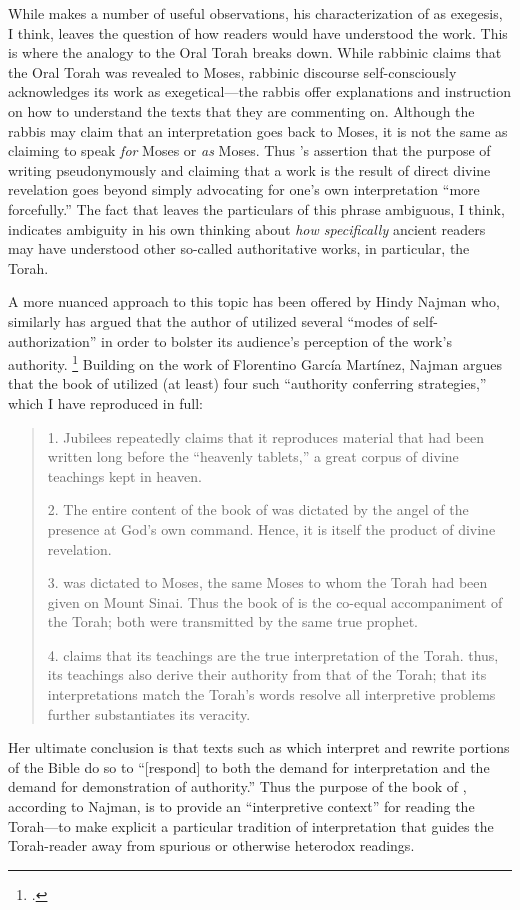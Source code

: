 While \vanderkam makes a number of useful observations, his characterization of \jub as exegesis, I think, leaves the question of how readers would have understood the work. This is where the analogy to the Oral Torah breaks down. While rabbinic claims that the Oral Torah was revealed to Moses, rabbinic discourse self-consciously acknowledges its work as exegetical---the rabbis offer explanations and instruction on how to understand the texts that they are commenting on. Although the rabbis may claim that an interpretation goes back to Moses, it is not the same as claiming to speak \emph{for} Moses or \emph{as} Moses. Thus \vanderkam's assertion that the purpose of writing pseudonymously and claiming that a work is the result of direct divine revelation goes beyond simply advocating for one's own interpretation ``more forcefully.'' The fact that \vanderkam leaves the particulars of this phrase ambiguous, I think, indicates ambiguity in his own thinking about \emph{how specifically} ancient readers may have understood \jub \visavis other so-called authoritative works, in particular, the Torah.

A more nuanced approach to this topic has been offered by Hindy Najman who, similarly has argued that the author of \jub utilized several ``modes of self-authorization'' in order to bolster its audience's perception of the work's authority.%
    \footnote{\cite[380]{najman_jsj1999}.}
Building on the work of Florentino García Martínez,\autocite{martinez_najman-tigchelaar2012} Najman argues that the book of \jub utilized (at least) four such ``authority conferring strategies,'' which I have reproduced in full:
    \begin{quote}
        1. Jubilees repeatedly claims that it reproduces material that had been written long before the ``heavenly tablets,'' a great corpus of divine teachings kept in heaven.

        2. The entire content of the book of \jub was dictated by the angel of the presence at God's own command. Hence, it is itself the product of divine revelation.

        3. \jub was dictated to Moses, the same Moses to whom the Torah had been given on Mount Sinai. Thus the book of \jub is the co-equal accompaniment of the Torah; both were transmitted by the same true prophet.

        4. \jub claims that its teachings are the true interpretation of the Torah. thus, its teachings also derive their authority from that of the Torah; that its interpretations match the Torah's words resolve all interpretive problems further substantiates its veracity.%
        \autocite[380]{najman_jsj1999}
    \end{quote}
\noindent
Her ultimate conclusion is that texts such as \jub which interpret and rewrite portions of the Bible do so to ``[respond] to both the demand for interpretation and the demand for demonstration of authority.''\autocite[408]{najman_jsj1999} Thus the purpose of the book of \jub, according to Najman, is to provide an ``interpretive context'' for reading the Torah---to make explicit a particular tradition of interpretation that guides the Torah-reader away from spurious or otherwise heterodox readings. 

